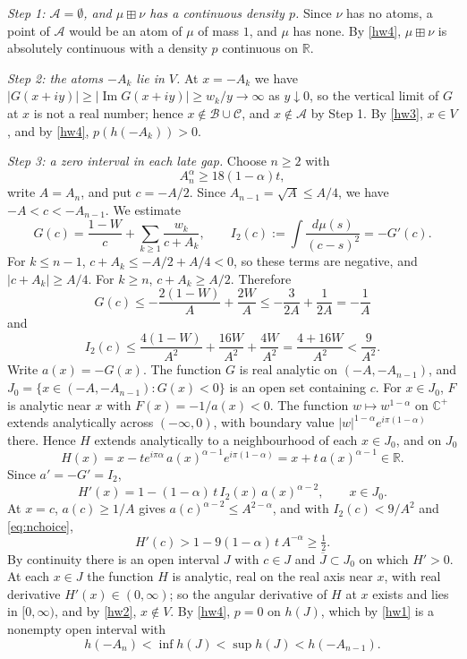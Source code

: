 \documentclass[11pt]{amsart}
\theoremstyle{definition}
\theoremstyle{remark}
\numberwithin{equation}{section}
\newcommand{\R}{\mathbb R}
\newcommand{\C}{\mathbb C}
\newcommand{\bp}{\boxplus}
\DeclareMathOperator{\Ima}{Im}
\begin{document}
\emph{Step 1: $\mathcal A=\emptyset$, and $\mu\bp\nu$ has a continuous density $p$.} Since $\nu$ has no atoms, a point of $\mathcal A$ would be an atom of $\mu$ of mass $1$, and $\mu$ has none. By \ref{hw4}, $\mu\bp\nu$ is absolutely continuous with a density $p$ continuous on $\R$.

\emph{Step 2: the atoms $-A_k$ lie in $V$.} At $x=-A_k$ we have $|G(x+iy)|\ge|\Ima G(x+iy)|\ge w_k/y\to\infty$ as $y\downarrow0$, so the vertical limit of $G$ at $x$ is not a real number; hence $x\notin\mathcal B\cup\mathcal C$, and $x\notin\mathcal A$ by Step 1. By \ref{hw3}, $x\in V$, and by \ref{hw4}, $p(h(-A_k))>0$.

\emph{Step 3: a zero interval in each late gap.} Choose $n\ge2$ with
\begin{equation}\label{eq:nchoice}
A_n^{\alpha}\ge18(1-\alpha)t,
\end{equation}
write $A=A_n$, and put $c=-A/2$. Since $A_{n-1}=\sqrt A\le A/4$, we have $-A<c<-A_{n-1}$. We estimate
\[
G(c)=\frac{1-W}{c}+\sum_{k\ge1}\frac{w_k}{c+A_k},\qquad I_2(c):=\int\frac{d\mu(s)}{(c-s)^2}=-G'(c).
\]
For $k\le n-1$, $c+A_k\le-A/2+A/4<0$, so these terms are negative, and $|c+A_k|\ge A/4$. For $k\ge n$, $c+A_k\ge A/2$. Therefore
\[
G(c)\le-\frac{2(1-W)}{A}+\frac{2W}{A}\le-\frac{3}{2A}+\frac{1}{2A}=-\frac1A
\]
and
\[
I_2(c)\le\frac{4(1-W)}{A^2}+\frac{16W}{A^2}+\frac{4W}{A^2}=\frac{4+16W}{A^2}<\frac9{A^2}.
\]
Write $a(x)=-G(x)$. The function $G$ is real analytic on $(-A,-A_{n-1})$, and $J_0=\{x\in(-A,-A_{n-1}):G(x)<0\}$ is an open set containing $c$. For $x\in J_0$, $F$ is analytic near $x$ with $F(x)=-1/a(x)<0$. The function $w\mapsto w^{1-\alpha}$ on $\C^+$ extends analytically across $(-\infty,0)$, with boundary value $|w|^{1-\alpha}e^{i\pi(1-\alpha)}$ there. Hence $H$ extends analytically to a neighbourhood of each $x\in J_0$, and on $J_0$
\[
H(x)=x-te^{i\pi\alpha}\,a(x)^{\alpha-1}e^{i\pi(1-\alpha)}=x+t\,a(x)^{\alpha-1}\in\R .
\]
Since $a'=-G'=I_2$,
\begin{equation}\label{eq:Hprime}
H'(x)=1-(1-\alpha)\,t\,I_2(x)\,a(x)^{\alpha-2},\qquad x\in J_0 .
\end{equation}
At $x=c$, $a(c)\ge1/A$ gives $a(c)^{\alpha-2}\le A^{2-\alpha}$, and with $I_2(c)<9/A^2$ and \eqref{eq:nchoice},
\[
H'(c)>1-9(1-\alpha)\,t\,A^{-\alpha}\ge\tfrac12 .
\]
By continuity there is an open interval $J$ with $c\in J$ and $\overline J\subset J_0$ on which $H'>0$. At each $x\in J$ the function $H$ is analytic, real on the real axis near $x$, with real derivative $H'(x)\in(0,\infty)$; so the angular derivative of $H$ at $x$ exists and lies in $[0,\infty)$, and by \ref{hw2}, $x\notin V$. By \ref{hw4}, $p=0$ on $h(J)$, which by \ref{hw1} is a nonempty open interval with
\[
h(-A_n)<\inf h(J)<\sup h(J)<h(-A_{n-1}).
\]
\end{document}
